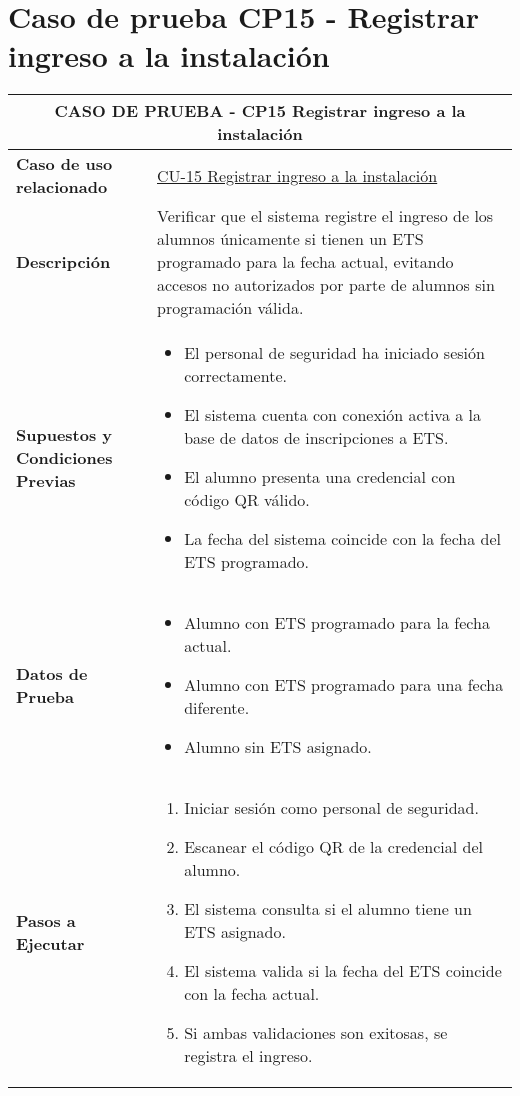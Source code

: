 \section{Caso de prueba CP15 - Registrar ingreso a la instalación}

\begin{longtable}{|p{5cm}|p{10cm}|}
	\hline \multicolumn{2}{|c|}{\textbf{CASO DE PRUEBA - CP15 Registrar ingreso a la instalación}} \\
	\hline \textbf{Caso de uso relacionado} & \hyperref[CU-15]{CU-15 Registrar ingreso a la instalación} \\
	\hline \textbf{Descripción} & Verificar que el sistema registre el ingreso de los alumnos únicamente si tienen un ETS programado para la fecha actual, evitando accesos no autorizados por parte de alumnos sin programación válida. \\
	\hline \textbf{Supuestos y Condiciones Previas} &
	\begin{itemize}
		\item El personal de seguridad ha iniciado sesión correctamente.
		\item El sistema cuenta con conexión activa a la base de datos de inscripciones a ETS.
		\item El alumno presenta una credencial con código QR válido.
		\item La fecha del sistema coincide con la fecha del ETS programado.
	\end{itemize} \\
	\hline \textbf{Datos de Prueba} &
	\begin{itemize}
		\item Alumno con ETS programado para la fecha actual.
		\item Alumno con ETS programado para una fecha diferente.
		\item Alumno sin ETS asignado.
	\end{itemize} \\
	\hline \textbf{Pasos a Ejecutar} &
	\begin{enumerate}
		\item Iniciar sesión como personal de seguridad.
		\item Escanear el código QR de la credencial del alumno.
		\item El sistema consulta si el alumno tiene un ETS asignado.
		\item El sistema valida si la fecha del ETS coincide con la fecha actual.
		\item Si ambas validaciones son exitosas, se registra el ingreso.

\end{enumerate}
\end{longtable}
